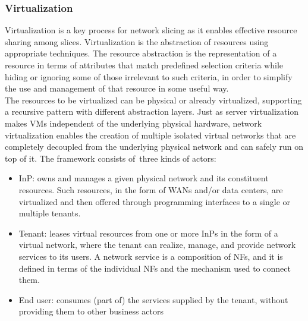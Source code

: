 \documentclass[a4paper,12pt]{report} %
\begin{document}
\subsubsection{Virtualization}
Virtualization is a key process for network slicing
as it enables effective resource sharing among
slices. Virtualization is the abstraction of resources
using appropriate techniques. The resource abstraction is the representation of a resource in terms of
attributes that match predefined selection criteria
while hiding or ignoring some of those irrelevant to such criteria, in order to simplify the
use and management of that resource in some
useful way. \\
The resources to be virtualized can
be physical or already virtualized, supporting a
recursive pattern with different abstraction layers.
Just as server virtualization makes \gls{VM}s independent of the underlying
physical hardware, network virtualization enables
the creation of multiple isolated virtual networks that
are completely decoupled from the underlying physical network and can safely run on top of it.
The framework consists of\ three kinds of actors:
\begin{itemize}
\item \gls{InP}: owns and manages a given physical network and its constituent resources. Such resources, in the form of
WANs and/or data centers, are virtualized and then offered through programming
interfaces to a single or multiple tenants.
\end{itemize}
\begin{itemize}
\item Tenant: leases virtual resources from one or
more InPs in the form of a virtual network,
where the tenant can realize, manage, and
provide network services to its users. A network service is a composition of NFs, and it
is defined in terms of the individual NFs and
the mechanism used to connect them.
\end{itemize}
\begin{itemize}
\item End user: consumes (part of) the services
supplied by the tenant, without providing
them to other business actors
\end{itemize}
\end{document}
